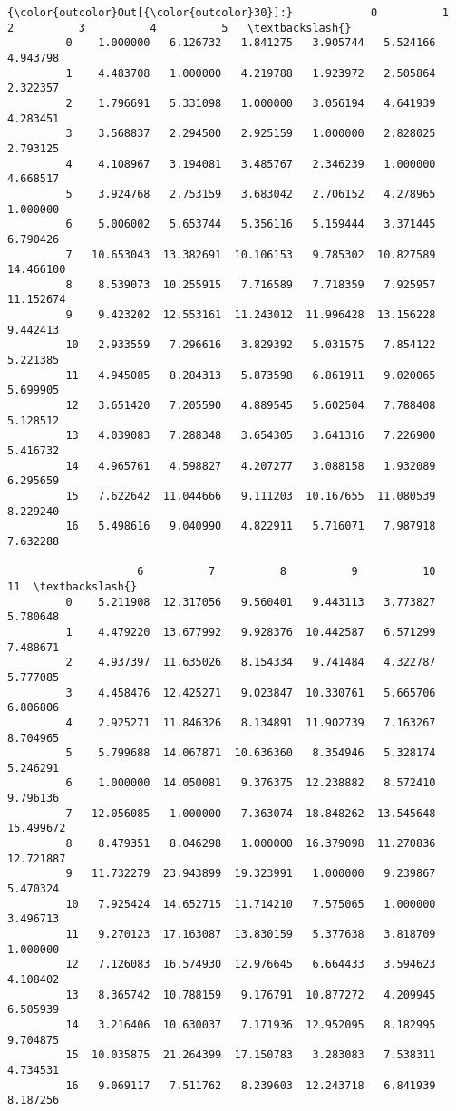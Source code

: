 \documentclass[11pt]{article}
\begin{document}
\begin{Verbatim}[commandchars=\\\{\}]
{\color{outcolor}Out[{\color{outcolor}30}]:}            0          1          2          3          4          5   \textbackslash{}
         0    1.000000   6.126732   1.841275   3.905744   5.524166   4.943798   
         1    4.483708   1.000000   4.219788   1.923972   2.505864   2.322357   
         2    1.796691   5.331098   1.000000   3.056194   4.641939   4.283451   
         3    3.568837   2.294500   2.925159   1.000000   2.828025   2.793125   
         4    4.108967   3.194081   3.485767   2.346239   1.000000   4.668517   
         5    3.924768   2.753159   3.683042   2.706152   4.278965   1.000000   
         6    5.006002   5.653744   5.356116   5.159444   3.371445   6.790426   
         7   10.653043  13.382691  10.106153   9.785302  10.827589  14.466100   
         8    8.539073  10.255915   7.716589   7.718359   7.925957  11.152674   
         9    9.423202  12.553161  11.243012  11.996428  13.156228   9.442413   
         10   2.933559   7.296616   3.829392   5.031575   7.854122   5.221385   
         11   4.945085   8.284313   5.873598   6.861911   9.020065   5.699905   
         12   3.651420   7.205590   4.889545   5.602504   7.788408   5.128512   
         13   4.039083   7.288348   3.654305   3.641316   7.226900   5.416732   
         14   4.965761   4.598827   4.207277   3.088158   1.932089   6.295659   
         15   7.622642  11.044666   9.111203  10.167655  11.080539   8.229240   
         16   5.498616   9.040990   4.822911   5.716071   7.987918   7.632288   
         
                    6          7          8          9          10         11  \textbackslash{}
         0    5.211908  12.317056   9.560401   9.443113   3.773827   5.780648   
         1    4.479220  13.677992   9.928376  10.442587   6.571299   7.488671   
         2    4.937397  11.635026   8.154334   9.741484   4.322787   5.777085   
         3    4.458476  12.425271   9.023847  10.330761   5.665706   6.806806   
         4    2.925271  11.846326   8.134891  11.902739   7.163267   8.704965   
         5    5.799688  14.067871  10.636360   8.354946   5.328174   5.246291   
         6    1.000000  14.050081   9.376375  12.238882   8.572410   9.796136   
         7   12.056085   1.000000   7.363074  18.848262  13.545648  15.499672   
         8    8.479351   8.046298   1.000000  16.379098  11.270836  12.721887   
         9   11.732279  23.943899  19.323991   1.000000   9.239867   5.470324   
         10   7.925424  14.652715  11.714210   7.575065   1.000000   3.496713   
         11   9.270123  17.163087  13.830159   5.377638   3.818709   1.000000   
         12   7.126083  16.574930  12.976645   6.664433   3.594623   4.108402   
         13   8.365742  10.788159   9.176791  10.877272   4.209945   6.505939   
         14   3.216406  10.630037   7.171936  12.952095   8.182995   9.704875   
         15  10.035875  21.264399  17.150783   3.283083   7.538311   4.734531   
         16   9.069117   7.511762   8.239603  12.243718   6.841939   8.187256   
         

\end{Verbatim}
\end{document}
